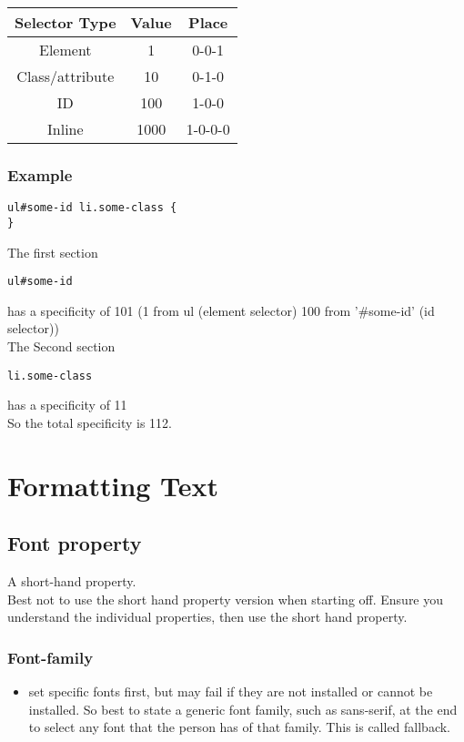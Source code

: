 \documentclass[]{article}
\begin{document}
\begin{center}
	\begin{tabular}{| c | c | c |} 
		\hline
		Selector Type  & Value & Place  \\ [0.5ex] 
		\hline
		Element  & 1 & 0-0-1 \\ 
		
		Class/attribute &  10 & 0-1-0 \\
		
		ID & 100 & 1-0-0 \\
		
		Inline & 1000 &1-0-0-0 \\[1ex] 
		\hline
	\end{tabular}
\end{center}

\subsubsection{Example}
\begin{lstlisting}
ul#some-id li.some-class {
}
\end{lstlisting}
The first section
\begin{lstlisting}
ul#some-id
\end{lstlisting}
has a specificity of 101 (1 from ul (element selector) 100 from '\#some-id' (id selector)) 
\\
The Second section
\begin{lstlisting}
li.some-class
\end{lstlisting}
has a specificity of 11
\\
So the total specificity is 112.

\section{Formatting Text}

\subsection{Font property}
A short-hand property.
\\
Best not to use the short hand property version when starting off.  Ensure you understand the individual properties, then use the short hand property.

\subsubsection{Font-family}
\begin{itemize}
	\item set specific fonts first, but may fail if they are not installed or cannot be installed.  So best to state a generic font family, such as sans-serif, at the end to select any font that the person has of that family.  This is called fallback.
\end{itemize}
\end{document}
